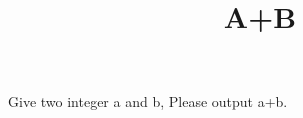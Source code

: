 \documentclass{article}
\title{A+B}
\begin{document}
Give two integer a and b, Please output a+b.
\end{document}
